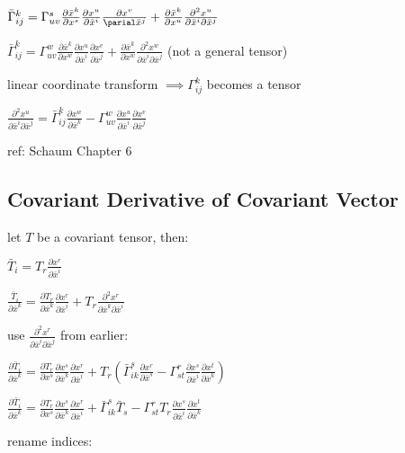 \documentclass[8pt,letter]{article}
\begin{document}
\begin{multicols*}{2}
  $\bar{\Gamma}_{ij}^k = \Gamma_{uv}^s \frac{\partial \bar{x}^k}{\partial x^s} \frac{\partial x^u}{\partial \bar{x}^i} \frac{\partial x^v}{\parial \bar{x}^j} + \frac{\partial \bar{x}^k}{\partial x^u} \frac{\partial^2 x^u}{\partial \bar{x}^i \partial \bar{x}^j}$

  $\bar{\Gamma}_{ij}^k = \Gamma_{uv}^w \frac{\partial \bar{x}^k}{\partial x^w} \frac{\partial x^u}{\partial \bar{x}^i} \frac{\partial x^v}{\partial \bar{x}^j} + \frac{\partial \bar{x}^k}{\partial x^w} \frac{\partial^2 x^w}{\partial \bar{x}^i \partial \bar{x}^j}$ (not a general tensor)

  linear coordinate transform $\implies \Gamma_{ij}^k$ becomes a tensor

  $\frac{\partial^2 x^u}{\partial \bar{x}^i \partial \bar{x}^j} = \bar{\Gamma}_{ij}^k \frac{\partial x^w}{\partial \bar{x}^k} - \Gamma_{uv}^w \frac{\partial x^u}{\partial \bar{x}^i} \frac{\partial x^v}{\partial \bar{x}^j}$

  ref: Schaum Chapter 6
  
  \subsection{Covariant Derivative of Covariant Vector}

  let $T$ be a covariant tensor, then:

  $\bar{T}_i = T_r \frac{\partial x^r}{\partial \bar{x}^i}$

  $\frac{\bar{T}_i}{\partial \bar{x}^k} = \frac{\partial T_r}{\partial \bar{x}^k} \frac{\partial x^r}{\partial \bar{x}^i} + T_r \frac{\partial^2 x^r}{\partial \bar{x}^k \partial \bar{x}^i}$

  use $\frac{\partial^2 x^r}{\partial \bar{x}^i \partial \bar{x}^j}$ from earlier:

  $\frac{\partial \bar{T}_i}{\partial \bar{x}^k} = \frac{\partial T_r}{\partial x^s} \frac{\partial x^s}{\partial \bar{x}^k} \frac{\partial x^r}{\partial \bar{x}^i} + T_r \left( \bar{\Gamma}_{ik}^s \frac{\partial x^r}{\partial \bar{x}^s} - \Gamma_{st}^r \frac{\partial x^s}{\partial \bar{x}^i} \frac{\partial x^t}{\partial \bar{x}^k} \right)$

  $\frac{\partial \bar{T}_i}{\partial \bar{x}^k} = \frac{\partial T_r}{\partial x^s} \frac{\partial x^s}{\partial \bar{x}^k} \frac{\partial x^r}{\partial \bar{x}^i} + \bar{\Gamma}_{ik}^s \bar{T}_s - \Gamma_{st}^r T_r \frac{\partial x^s}{\partial \bar{x}^i} \frac{\partial x^t}{\partial \bar{x}^k}$

  rename indices:


\end{multicols*}
\end{document}
